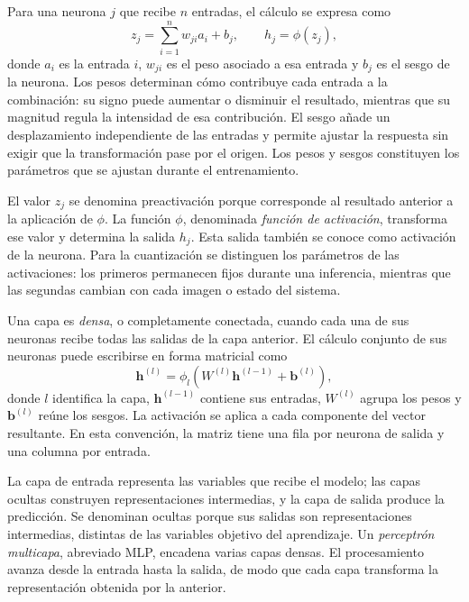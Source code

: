 Para una neurona $j$ que recibe $n$ entradas, el cálculo se expresa como
\begin{equation}
z_j=\sum_{i=1}^{n}w_{ji}a_i+b_j,\qquad h_j=\phi(z_j),\label{eq:neurona}
\end{equation}
donde $a_i$ es la entrada $i$, $w_{ji}$ es el peso asociado a esa entrada y $b_j$ es el sesgo de la neurona. Los pesos determinan cómo contribuye cada entrada a la combinación: su signo puede aumentar o disminuir el resultado, mientras que su magnitud regula la intensidad de esa contribución. El sesgo añade un desplazamiento independiente de las entradas y permite ajustar la respuesta sin exigir que la transformación pase por el origen. Los pesos y sesgos constituyen los parámetros que se ajustan durante el entrenamiento.

El valor $z_j$ se denomina preactivación porque corresponde al resultado anterior a la aplicación de $\phi$. La función $\phi$, denominada \emph{función de activación}, transforma ese valor y determina la salida $h_j$. Esta salida también se conoce como activación de la neurona. Para la cuantización se distinguen los parámetros de las activaciones: los primeros permanecen fijos durante una inferencia, mientras que las segundas cambian con cada imagen o estado del sistema.

Una capa es \emph{densa}, o completamente conectada, cuando cada una de sus neuronas recibe todas las salidas de la capa anterior. El cálculo conjunto de sus neuronas puede escribirse en forma matricial como
\begin{equation}
\mathbf h^{(l)}=\phi_l\!\left(W^{(l)}\mathbf h^{(l-1)}+\mathbf b^{(l)}\right),\label{eq:densa}
\end{equation}
donde $l$ identifica la capa, $\mathbf h^{(l-1)}$ contiene sus entradas, $W^{(l)}$ agrupa los pesos y $\mathbf b^{(l)}$ reúne los sesgos. La activación se aplica a cada componente del vector resultante. En esta convención, la matriz tiene una fila por neurona de salida y una columna por entrada.

La capa de entrada representa las variables que recibe el modelo; las capas ocultas construyen representaciones intermedias, y la capa de salida produce la predicción. Se denominan ocultas porque sus salidas son representaciones intermedias, distintas de las variables objetivo del aprendizaje. Un \emph{perceptrón multicapa}, abreviado MLP, encadena varias capas densas. El procesamiento avanza desde la entrada hasta la salida, de modo que cada capa transforma la representación obtenida por la anterior.


